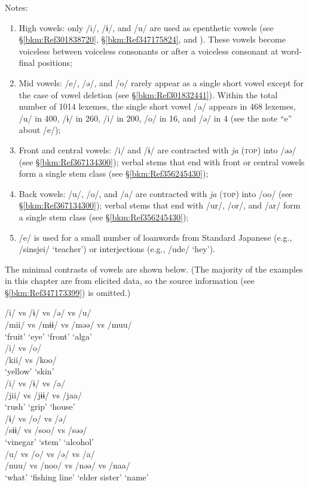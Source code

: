 Notes:
\begin{enumerate}[label=\alph*.]
\item High vowels: only /i/, /ɨ/, and /u/ are used as epenthetic vowels (see §\ref{bkm:Ref301838720}, §\ref{bkm:Ref347175824}, and ). These vowels become voiceless between voiceless consonants or after a voiceless consonant at word-final positions;
\item \label{bkm:Ref347176670}Mid vowels: /e/, /ə/, and /o/ rarely appear as a single short vowel except for the case of vowel deletion (see §\ref{bkm:Ref301832441}). Within the total number of 1014 lexemes, the single short vowel /a/ appears in 468 lexemes, /u/ in 400, /ɨ/ in 260, /i/ in 200, /o/ in 16, and /ə/ in 4 (see the note “e” about /e/);
\item Front and central vowels: /i/ and /ɨ/ are contracted with \textit{ja} (\textsc{top}) into /əə/ (see §\ref{bkm:Ref367134300}); verbal stems that end with front or central vowels form a single stem class (see §\ref{bkm:Ref356245430});
\item Back vowels: /u/, /o/, and /a/ are contracted with \textit{ja} (\textsc{top}) into /oo/ (see §\ref{bkm:Ref367134300}); verbal stems that end with /ur/, /or/, and /ar/ form a single stem class (see §\ref{bkm:Ref356245430});
\item /e/ is used for a small number of loanwords from Standard Japanese (e.g., /sinsjei/ ‘teacher’) or interjections (e.g., /ude/ ‘hey’).
\end{enumerate}

The minimal contrasts of vowels are shown below. (The majority of the examples in this chapter are from elicited data, so the source information (see §\ref{bkm:Ref347173399}) is omitted.)

\ea 
\ea /i/ vs /ɨ/ vs /ə/ vs /u/\\
 /mii/  vs  /mɨɨ/  vs  /məə/  vs  /muu/\\
 ‘fruit’ {} ‘eye’ {}  ‘front’ {}  ‘alga’\\
\ex /i/ vs /o/\\
/kii/  vs  /koo/\\
‘yellow’ {}  ‘skin’\\
\ex /i/ vs /ɨ/ vs /a/\\
/jii/  vs  /jɨɨ/  vs  /jaa/\\
‘rush’ {}  ‘grip’ {}  ‘house’\\
\ex /ɨ/ vs /o/ vs /ə/\\
/sɨɨ/  vs  /soo/  vs  /səə/\\
‘vinegar’ {}  ‘stem’ {}  ‘alcohol’\\
\ex /u/ vs /o/ vs /ə/ vs /a/\\
/nuu/  vs  /noo/  vs  /nəə/  vs  /naa/\\
‘what’ {}  ‘fishing line’ {}  ‘elder sister’ {}  ‘name’\\
\z
\z

